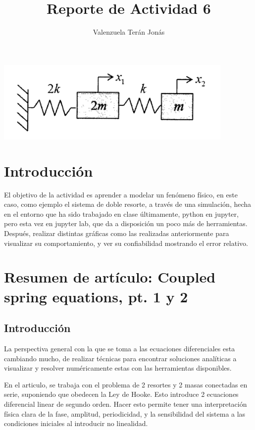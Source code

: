 \documentclass[a4paper]{article}
\title{Reporte de Actividad 6}
\author{Valenzuela Terán Jonás}
\begin{document}
\maketitle


\begin{center}
	\includegraphics[height=4cm]{doblespring.png}
\end{center}

\section{Introducción}

El objetivo de la actividad es aprender a modelar un fenómeno físico, en este caso, como ejemplo el sistema de doble resorte, a través de una simulación, hecha en el entorno que ha sido trabajado en clase últimamente, python en jupyter, pero esta vez en jupyter lab, que da a disposición un poco más de herramientas. Después, realizar distintas gráficas como las realizadas anteriormente para visualizar su comportamiento, y ver su confiabilidad mostrando el error relativo.


\section{Resumen de artículo: Coupled spring equations, pt. 1 y 2}

\subsection{Introducción}

La perspectiva general con la que se toma a las ecuaciones diferenciales esta cambiando mucho, de realizar técnicas para encontrar soluciones analíticas a visualizar y resolver numéricamente estas con las herramientas disponibles.

En el articulo, se trabaja con el problema de 2 resortes y 2 masas conectadas en serie, suponiendo que obedecen la Ley de Hooke. Esto introduce 2 ecuaciones diferencial linear de segundo orden. Hacer esto permite tener una interpretación física clara de la fase, amplitud, periodicidad, y la sensibilidad del sistema a las condiciones iniciales al introducir no linealidad.
\end{document}

